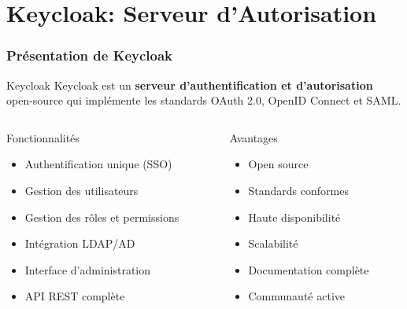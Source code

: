 \documentclass[aspectratio=169]{beamer}
\begin{document}
\section{Keycloak: Serveur d'Autorisation}

\begin{frame}
    \frametitle{\faKey \quad Présentation de Keycloak}
    \begin{alertblock}{Keycloak}
        \Large Keycloak est un \textbf{serveur d'authentification et d'autorisation} open-source qui implémente les standards OAuth 2.0, OpenID Connect et SAML.
    \end{alertblock}
    
    \vspace{0.5cm}
    \begin{columns}
        \begin{column}{0.5\textwidth}
            \begin{block}{\faCogs \quad Fonctionnalités}
                \begin{itemize}
                    \item \textcolor{primaryblue}{\faSignInAlt \quad Authentification unique (SSO)}
                    \item \textcolor{accentgreen}{\faUsers \quad Gestion des utilisateurs}
                    \item \textcolor{warningorange}{\faUserShield \quad Gestion des rôles et permissions}
                    \item \textcolor{errorred}{\faDatabase \quad Intégration LDAP/AD}
                    \item \textcolor{primaryblue}{\faCog \quad Interface d'administration}
                    \item \textcolor{accentgreen}{\faCode \quad API REST complète}
                \end{itemize}
            \end{block}
        \end{column}
        \begin{column}{0.5\textwidth}
            \begin{block}{\faStar \quad Avantages}
                \begin{itemize}
                    \item \textcolor{accentgreen}{\faOpenSource \quad Open source}
                    \item \textcolor{primaryblue}{\faCheckCircle \quad Standards conformes}
                    \item \textcolor{warningorange}{\faServer \quad Haute disponibilité}
                    \item \textcolor{errorred}{\faExpand \quad Scalabilité}
                    \item \textcolor{primaryblue}{\faBook \quad Documentation complète}
                    \item \textcolor{accentgreen}{\faUsers \quad Communauté active}
                \end{itemize}
            \end{block}
        \end{column}
    \end{columns}
\end{frame}
\end{document}
